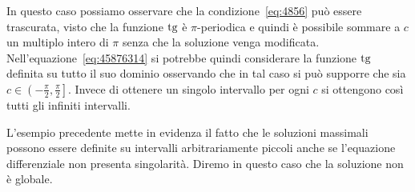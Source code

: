 \begin{example}
In questo caso possiamo osservare che la condizione~\eqref{eq:4856} può essere
trascurata, visto che la funzione $\operatorname{tg}$ è $\pi$-periodica e quindi
è possibile sommare a $c$ un multiplo intero di $\pi$ senza che la soluzione
venga modificata.
Nell'equazione~\eqref{eq:45876314} si potrebbe
quindi considerare la funzione $\operatorname{tg}$
definita su tutto il suo dominio osservando che in tal caso si può
supporre che sia $c\in \left(-\frac \pi 2, \frac \pi 2\right]$.
Invece di ottenere un singolo intervallo per ogni $c$ si ottengono così
tutti gli infiniti intervalli.
\end{example}

\begin{remark}
L'esempio precedente mette in evidenza il fatto che le soluzioni massimali possono essere definite
su intervalli arbitrariamente piccoli anche se l'equazione differenziale
non presenta singolarità. Diremo in questo caso che
la soluzione non è globale.
\end{remark}


